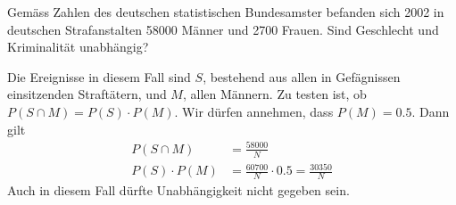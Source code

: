 Gemäss Zahlen des deutschen statistischen Bundesamster
befanden sich 2002 in deutschen Strafanstalten 58000 Männer
und 2700 Frauen. Sind Geschlecht und Kriminalität unabhängig?


\begin{loesung}
Die Ereignisse in diesem Fall sind $S$, bestehend aus allen in Gefägnissen
einsitzenden Straftätern, und $M$, allen Männern. Zu testen ist, ob
$P(S\cap M)=P(S)\cdot P(M)$. Wir dürfen annehmen, dass $P(M)=0.5$.
Dann gilt
\begin{align*}
P(S\cap M)&=\frac{58000}{N}\\
P(S)\cdot P(M)&=\frac{60700}{N}\cdot 0.5 = \frac{30350}{N}
\end{align*}
Auch in diesem Fall dürfte Unabhängigkeit nicht gegeben sein.
\end{loesung}

